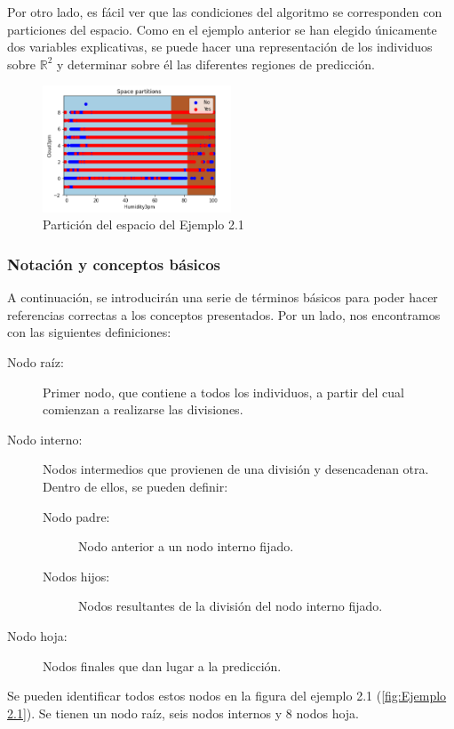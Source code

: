\documentclass[12pt,twoside]{article}
\begin{document}
Por otro lado, es fácil ver que las condiciones del algoritmo se corresponden con particiones del espacio. Como en el ejemplo anterior se han elegido únicamente dos variables explicativas, se puede hacer una representación de los individuos sobre $\mathbb{R}^{2}$ y determinar sobre él las diferentes regiones de predicción.
\begin{figure}[h]
	\centering
	\includegraphics[width = 0.5\textwidth]{ex2_1_02}
	\caption{Partición del espacio del Ejemplo 2.1}
	\label{fig:Ejemplo 2.1.2}
\end{figure}


\subsubsection{Notación y conceptos básicos}

A continuación, se introducirán una serie de términos básicos para poder hacer referencias correctas a los conceptos presentados. Por un lado, nos encontramos con las siguientes definiciones:
\begin{description}
\item[Nodo raíz: ]Primer nodo, que contiene a todos los individuos, a partir del cual comienzan a realizarse las divisiones.
\item[Nodo interno: ]Nodos intermedios que provienen de una división y desencadenan otra. Dentro de ellos, se pueden definir:
	\begin{description}
	\item[Nodo padre: ]Nodo anterior a un nodo interno fijado.
	\item[Nodos hijos: ]Nodos resultantes de la división del nodo interno fijado.
	\end{description}
\item[Nodo hoja: ]Nodos finales que dan lugar a la predicción.
\end{description}

Se pueden identificar todos estos nodos en la figura del ejemplo 2.1 (\ref{fig:Ejemplo 2.1}). Se tienen un nodo raíz, seis nodos internos y 8 nodos hoja.
\end{document}
